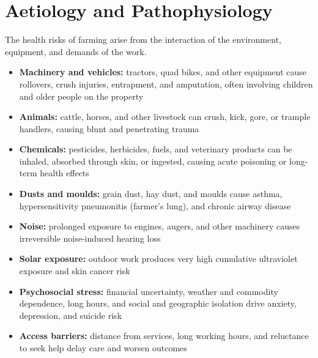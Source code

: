 \section*{Aetiology and Pathophysiology}
The health risks of farming arise from the interaction of the environment, equipment, and demands of the work.
\begin{itemize}
    \item \textbf{Machinery and vehicles:} tractors, quad bikes, and other equipment cause rollovers, crush injuries, entrapment, and amputation, often involving children and older people on the property
    \item \textbf{Animals:} cattle, horses, and other livestock can crush, kick, gore, or trample handlers, causing blunt and penetrating trauma
    \item \textbf{Chemicals:} pesticides, herbicides, fuels, and veterinary products can be inhaled, absorbed through skin, or ingested, causing acute poisoning or long-term health effects
    \item \textbf{Dusts and moulds:} grain dust, hay dust, and moulds cause asthma, hypersensitivity pneumonitis (farmer's lung), and chronic airway disease
    \item \textbf{Noise:} prolonged exposure to engines, augers, and other machinery causes irreversible noise-induced hearing loss
    \item \textbf{Solar exposure:} outdoor work produces very high cumulative ultraviolet exposure and skin cancer risk
    \item \textbf{Psychosocial stress:} financial uncertainty, weather and commodity dependence, long hours, and social and geographic isolation drive anxiety, depression, and suicide risk
    \item \textbf{Access barriers:} distance from services, long working hours, and reluctance to seek help delay care and worsen outcomes
\end{itemize}

